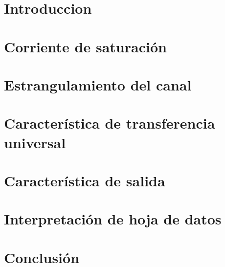 \documentclass[chaptersright]{informeutn}
\begin{document}
\maketitle
\tableofcontents

\chapter{Introduccion}
\chapter{Corriente de saturación}
\chapter{Estrangulamiento del canal}
\chapter{Característica de transferencia universal}
\chapter{Característica de salida}
\chapter{Interpretación de hoja de datos}
\chapter{Conclusión}
\end{document}
